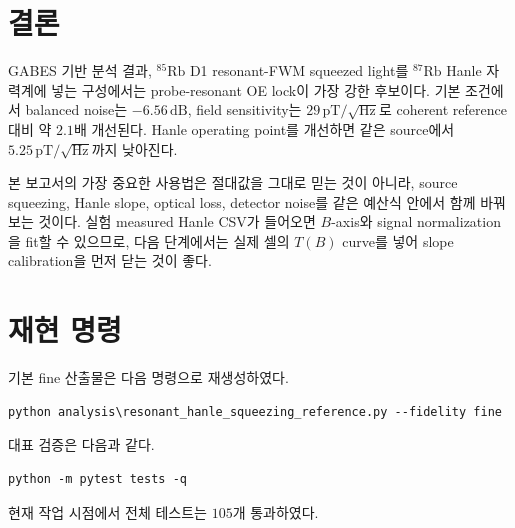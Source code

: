 \documentclass[11pt,a4paper]{article}
\newcommand{\dB}{\,\mathrm{dB}}
\newcommand{\pT}{\,\mathrm{pT}}
\newcommand{\sqrtHz}{/\sqrt{\mathrm{Hz}}}
\newcommand{\Rb}[1]{\({}^{#1}\mathrm{Rb}\)}
\begin{document}
\section{결론}

GABES 기반 분석 결과, \Rb{85} D1 resonant-FWM squeezed light를 \Rb{87} Hanle 자력계에 넣는
구성에서는 probe-resonant OE lock이 가장 강한 후보이다. 기본 조건에서 balanced noise는
\(-6.56\dB\), field sensitivity는 \(29\pT\sqrtHz\)로 coherent reference 대비 약 \(2.1\)배
개선된다. Hanle operating point를 개선하면 같은 source에서 \(5.25\pT\sqrtHz\)까지 낮아진다.

본 보고서의 가장 중요한 사용법은 절대값을 그대로 믿는 것이 아니라,
source squeezing, Hanle slope, optical loss, detector noise를 같은 예산식 안에서 함께 바꿔 보는 것이다.
실험 measured Hanle CSV가 들어오면 \(B\)-axis와 signal normalization을 fit할 수 있으므로,
다음 단계에서는 실제 셀의 \(T(B)\) curve를 넣어 slope calibration을 먼저 닫는 것이 좋다.

\appendix
\section{재현 명령}

기본 fine 산출물은 다음 명령으로 재생성하였다.
\begin{verbatim}
python analysis\resonant_hanle_squeezing_reference.py --fidelity fine
\end{verbatim}

대표 검증은 다음과 같다.
\begin{verbatim}
python -m pytest tests -q
\end{verbatim}
현재 작업 시점에서 전체 테스트는 \(105\)개 통과하였다.
\end{document}
